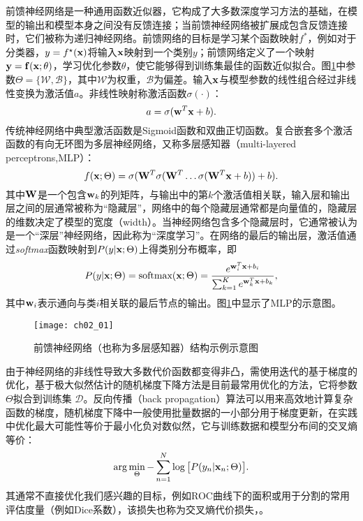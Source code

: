 前馈神经网络是一种通用函数近似器\cite{Hornik1989}，它构成了大多数深度学习方法的基础，在模型的输出和模型本身之间没有反馈连接；当前馈神经网络被扩展成包含反馈连接时，它们被称为递归神经网络。前馈网络的目标是学习某个函数映射$f^*$，例如对于分类器，$y = f^{\star}(\bf x)$将输入$\bf x$映射到一个类别$y$；前馈网络定义了一个映射$\bf y = f( \bf x; \theta)$，学习优化参数$\theta$，使它能够得到训练集最佳的函数近似拟合。图\ref{fig:ch02_01}中参数$\Theta = \{\mathcal{W}, \mathcal{B}\}$，其中$\mathcal{W}$为权重，$\mathcal{B}$为偏差。输入${\bf x}$与模型参数的线性组合经过非线性变换为激活值$a$。非线性映射称激活函数$\sigma(\cdot)$： 
\begin{equation}
 a = \sigma({\bf w}^{T}{\bf x} + b).
\end{equation}
传统神经网络中典型激活函数是Sigmoid函数和双曲正切函数。复合嵌套多个激活函数的有向无环图为多层神经网络，又称多层感知器（multi-layered perceptrons,MLP）：
\begin{equation}
 	f({\bf x}; \Theta) = \sigma( {\bf W}^{T}\sigma({\bf W}^{T} \ldots \sigma({\bf W}^{T} {\bf x} + b)  ) + b).
 \end{equation}
其中${\bf W}$是一个包含${\bf w}_{k}$的列矩阵，与输出中的第$k$个激活值相关联，输入层和输出层之间的层通常被称为“隐藏层”，网络中的每个隐藏层通常都是向量值的，隐藏层的维数决定了模型的宽度（width）。当神经网络包含多个隐藏层时，它通常被认为是一个“深层”神经网络，因此称为“深度学习”。在网络的最后的输出层，激活值通过{\it softmax}函数映射到$P(y | {\bf x}; \Theta)$上得类别分布概率，即
\begin{equation}
 P(y | {\bf x}; \Theta) = \text{softmax}({\bf x}; \Theta) = \frac{e^{{\bf w}_{i}^{T}{\bf x} + b_{i}}}{\sum^{K}_{k = 1} e^{{\bf w}_{k}^{T}{\bf x} + b_{k}}},
\end{equation}
其中${\bf w}_{i}$表示通向与类$i$相关联的最后节点的输出。图\ref{fig:ch02_01}中显示了MLP的示意图。
\begin{figure}[!htbp]
    \centering
    \texttt{[image: ch02\_01]}
    \caption{前馈神经网络（也称为多层感知器）结构示例示意图}
    \label{fig:ch02_01}
\end{figure}

由于神经网络的非线性导致大多数代价函数都变得非凸，需使用迭代的基于梯度的优化，基于极大似然估计的随机梯度下降方法是目前最常用优化的方法，它将参数$\Theta$拟合到训练集 $\mathcal{D}$。反向传播（back propagation）算法可以用来高效地计算复杂函数的梯度，随机梯度下降中一般使用批量数据的一小部分用于梯度更新，在实践中优化最大可能性等价于最小化负对数似然，它与训练数据和模型分布间的交叉熵等价：
\begin{equation}
 \arg \min_{\Theta} - \sum^{N}_{n = 1} \log\big[ P(y_{n}| {\bf x}_{n}; \Theta) \big].
\end{equation}
其通常不直接优化我们感兴趣的目标，例如ROC曲线下的面积或用于分割的常用评估度量（例如Dice系数），该损失也称为交叉熵代价损失，。

